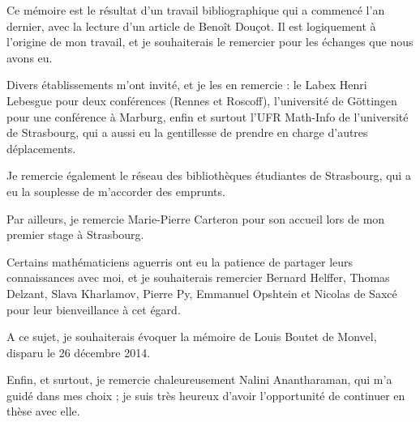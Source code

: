 \vfill

Ce mémoire est le résultat d'un travail bibliographique qui a commencé
l'an dernier, avec la lecture d'un article de Benoît Dou\c cot. Il
est logiquement à l'origine de mon travail, et je souhaiterais le
remercier pour les échanges que nous avons eu.

 Divers établissements m'ont invité, et je les en remercie : le Labex Henri Lebesgue pour deux conférences (Rennes et Roscoff),
l'université de G\"ottingen pour une conférence à Marburg,
enfin et surtout l'UFR Math-Info de
l'université de Strasbourg, qui a aussi eu la gentillesse de
prendre en charge d'autres déplacements. 

Je remercie également le réseau des bibliothèques étudiantes de
Strasbourg, qui a eu la souplesse de m'accorder des emprunts.

Par ailleurs, je remercie Marie-Pierre
Carteron pour son accueil lors de mon premier stage à Strasbourg. 

Certains mathématiciens aguerris ont eu la patience de partager leurs
connaissances avec moi, et je souhaiterais remercier Bernard Helffer,
Thomas Delzant, Slava Kharlamov, Pierre Py, Emmanuel Opshtein et Nicolas de Saxcé pour leur bienveillance à cet égard.

A ce sujet, je souhaiterais évoquer la mémoire de Louis Boutet de
Monvel, disparu le 26 décembre 2014.

Enfin, et surtout, je remercie chaleureusement Nalini Anantharaman,
qui m'a guidé dans mes choix ; je suis très heureux d'avoir
l'opportunité de continuer en thèse avec elle.
\vfill